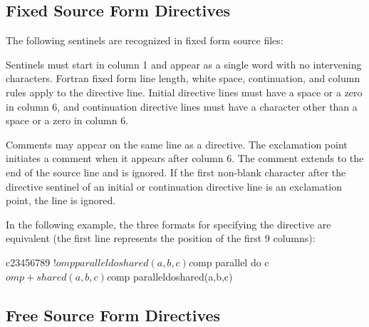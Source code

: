 \clearpage  %

\begin{fortranspecific}
\vspace{-6ex}  %
\subsection{Fixed Source Form Directives}
\label{subsec:Fixed Source Form Directives}

The following sentinels are recognized in fixed form source files:


Sentinels must start in column 1 and appear as a single word with no intervening
characters. Fortran fixed form line length, white space, continuation, and column 
rules apply to the directive line. Initial directive lines must have a space or 
a zero in column 6, and continuation directive lines must have a character other 
than a space or a zero in column 6.

Comments may appear on the same line as a directive. The exclamation point initiates a
comment when it appears after column 6. The comment extends to the end of the source
line and is ignored. If the first non-blank character after the directive sentinel of 
an initial or continuation directive line is an exclamation point, the line is ignored.

\begin{note}
In the following example, the three formats for specifying the directive are
equivalent (the first line represents the position of the first 9 columns):

\begin{ompfPragma}
c23456789
!$omp parallel do shared(a,b,c)

c$omp parallel do
c$omp+shared(a,b,c)

c$omp paralleldoshared(a,b,c)
\end{ompfPragma}
\end{note}



\subsection{Free Source Form Directives}
\label{subsec:Free Source Form Directives}


\end{fortranspecific}
